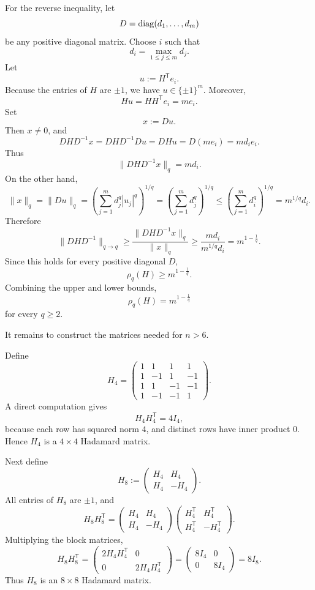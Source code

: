 For the reverse inequality, let
\[
D=\operatorname{diag}(d_1,\dots,d_m)
\]
be any positive diagonal matrix. Choose \(i\) such that
\[
d_i=\max_{1\le j\le m} d_j.
\]
Let
\[
u:=H^{\mathsf T}e_i.
\]
Because the entries of \(H\) are \(\pm1\), we have \(u\in\{\pm1\}^m\). Moreover,
\[
Hu=HH^{\mathsf T}e_i=me_i.
\]
Set
\[
x:=Du.
\]
Then \(x\ne 0\), and
\[
DHD^{-1}x
=
DHD^{-1}Du
=
DHu
=
D(me_i)
=
md_i e_i.
\]
Thus
\[
\|DHD^{-1}x\|_q=md_i.
\]
On the other hand,
\[
\|x\|_q
=
\|Du\|_q
=
\left(\sum_{j=1}^m d_j^q|u_j|^q\right)^{1/q}
=
\left(\sum_{j=1}^m d_j^q\right)^{1/q}
\le
\left(\sum_{j=1}^m d_i^q\right)^{1/q}
=
m^{1/q}d_i.
\]
Therefore
\[
\|DHD^{-1}\|_{q\to q}
\ge
\frac{\|DHD^{-1}x\|_q}{\|x\|_q}
\ge
\frac{md_i}{m^{1/q}d_i}
=
m^{1-\frac1q}.
\]
Since this holds for every positive diagonal \(D\),
\[
\rho_q(H)\ge m^{1-\frac1q}.
\]
Combining the upper and lower bounds,
\[
\boxed{\rho_q(H)=m^{1-\frac1q}}
\]
for every \(q\ge 2\).

It remains to construct the matrices needed for \(n>6\).

Define
\[
H_4=
\begin{pmatrix}
1&1&1&1\\
1&-1&1&-1\\
1&1&-1&-1\\
1&-1&-1&1
\end{pmatrix}.
\]
A direct computation gives
\[
H_4H_4^{\mathsf T}
=
4I_4,
\]
because each row has squared norm \(4\), and distinct rows have inner product \(0\). Hence \(H_4\) is a \(4\times 4\) Hadamard matrix.

Next define
\[
H_8:=
\begin{pmatrix}
H_4&H_4\\
H_4&-H_4
\end{pmatrix}.
\]
All entries of \(H_8\) are \(\pm1\), and
\[
H_8H_8^{\mathsf T}
=
\begin{pmatrix}
H_4&H_4\\
H_4&-H_4
\end{pmatrix}
\begin{pmatrix}
H_4^{\mathsf T}&H_4^{\mathsf T}\\
H_4^{\mathsf T}&-H_4^{\mathsf T}
\end{pmatrix}.
\]
Multiplying the block matrices,
\[
H_8H_8^{\mathsf T}
=
\begin{pmatrix}
2H_4H_4^{\mathsf T}&0\\
0&2H_4H_4^{\mathsf T}
\end{pmatrix}
=
\begin{pmatrix}
8I_4&0\\
0&8I_4
\end{pmatrix}
=
8I_8.
\]
Thus \(H_8\) is an \(8\times 8\) Hadamard matrix.

